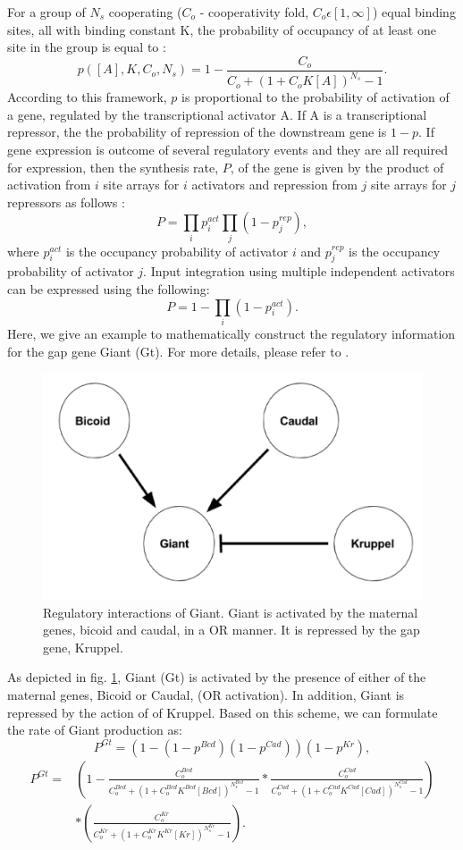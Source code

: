 For a group of $N_s$ cooperating ($C_o$ - cooperativity fold, $C_o \epsilon [1, \infty]$) equal binding sites, all with binding constant K, the probability of occupancy of at least one site in the group is equal to \cite{zinzen06}:
$$p\left([A], K, C_o, N_s\right) = 1 - \frac{C_o}{C_o + (1+C_o K [A])^{N_s} - 1}.$$
According to this framework, $p$ is proportional to the probability of activation of a gene, regulated by the transcriptional activator A. If A is a transcriptional repressor, the the probability of repression of the downstream gene is $1 - p$. If gene expression is outcome of several regulatory events and they are all required for expression, then the synthesis rate, $P$, of the gene is given by the product of activation from $i$ site arrays for $i$ activators and repression from $j$ site arrays for $j$ repressors as follows \cite{bolouri08}:
$$P = \prod _i p_i^{act} \prod_j \left( 1 - p_j^{rep} \right ),$$
where $p^{act}_i$ is the occupancy probability of activator $i$ and $p^{rep}_j$ is the occupancy probability of activator $j$.
Input integration using multiple independent activators can be expressed using the following:
$$P = 1 - \prod_i \left( 1 - p_i^{act} \right ).$$ 
Here, we give an example to mathematically construct the regulatory information for the gap gene Giant (Gt). For more details, please refer to \cite{papatsenko11}.
\begin{figure}[H]
  \centering
	\includegraphics[scale=0.55]{embryo/giant_activation.png}
  \caption{Regulatory interactions of Giant. Giant is activated by the maternal genes, bicoid and caudal, in a OR manner. It is repressed by the gap gene, Kruppel.}
\label{fig:giant_activation}
\end{figure}
As depicted in fig. \ref{fig:giant_activation}, Giant (Gt) is activated by the presence of either of the maternal genes, Bicoid or Caudal, (OR activation). In addition, Giant is repressed by the action of of Kruppel. Based on this scheme, we can formulate the rate of Giant production as:
$$P^{Gt} = (1 - (1 - p^{Bcd})(1 - p^{Cad}))(1 - p^{Kr}),$$
\begin{align*}
P^{Gt} = &(1-\frac{C_o^{Bcd}}{C_o^{Bcd} + (1+C_o^{Bcd} K^{Bcd} [Bcd])^{N_s^{Bcd}} - 1}*\frac{C_o^{Cad}}{C_o^{Cad} + (1+C_o^{Cad} K^{Cad} [Cad])^{N_s^{Cad}} - 1})\\
&*(\frac{C_o^{Kr}}{C_o^{Kr} + (1+C_o^{Kr} K^{Kr} [Kr])^{N_s^{Kr}} - 1}).
\end{align*}

